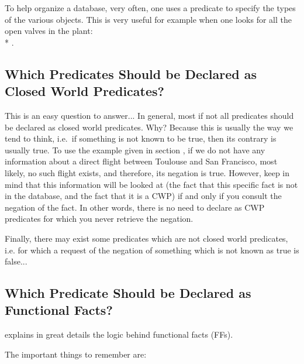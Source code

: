 To help organize a database, very often, one uses a  predicate
to specify the types of the various objects. This is very useful for
example when one looks for all the open valves in the plant: \\*
.

\subsection{Which Predicates Should be Declared as Closed World Predicates?}

This is an easy question to answer... In general, most if not all
predicates should be declared as closed world predicates. Why? Because
this is usually the way we tend to think, i.e.\ if something is not known
to be true, then its contrary is usually true. To use the example given
in section , if we do not have any
information about a direct flight between Toulouse and San Francisco, most
likely, no such flight exists, and therefore, its negation is true.
However, keep in mind that this information will be looked at (the fact
that this specific fact is not in the database, and the fact that it is a
CWP) if and only if you consult the negation of the fact. In other words,
there is no need to declare as CWP predicates for which you never retrieve
the negation.

Finally, there may exist some predicates which are not closed world
predicates, i.e.
for which a request of the negation of something which is not known as
true is false...

\subsection{Which Predicate Should be Declared as Functional Facts?}

 explains in great details the logic
behind functional facts (FFs).

The important things to remember are:

